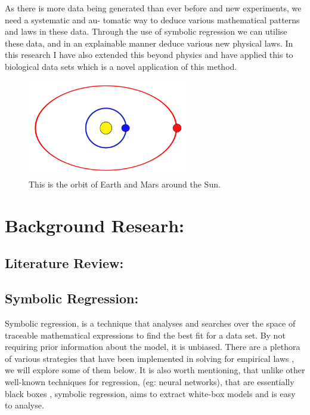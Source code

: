 \documentclass{article}
\begin{document}
As there is more data being generated than ever before and new experiments, we need a systematic and au-
tomatic way to deduce various mathematical patterns and laws in these data. Through the use of symbolic
regression we can utilise these data, and in an explainable manner deduce various new physical laws. In this
research I have also extended this beyond physics and have applied this to biological data sets which is a novel
application of this method.\\


\begin{figure}[h] 
    \centering
    \includegraphics[width=7cm]{Sun_Mars_Orbit} 
    \caption{This is the orbit of Earth and Mars around the Sun.}
    \label{fig:Orbit} 
\end{figure}


\section{Background Researh: }

\subsection{Literature Review: }

\subsection{Symbolic Regression: }

Symbolic regression, is a technique that analyses and searches over the space of traceable mathematical
expressions to find the best fit for a data set. By not requiring prior information about the model,
it is unbiased. There are a plethora of various strategies \cite{lacava2021} that have been implemented in solving for
empirical laws \cite{Schmidt22009}, we will explore some of them below. It is also worth mentioning, that unlike other
well-known techniques for regression, (eg: neural networks), that are essentially black boxes \cite{abroshan2023}, symbolic
regression, aims to extract white-box models and is easy to analyse.\\
\end{document}
